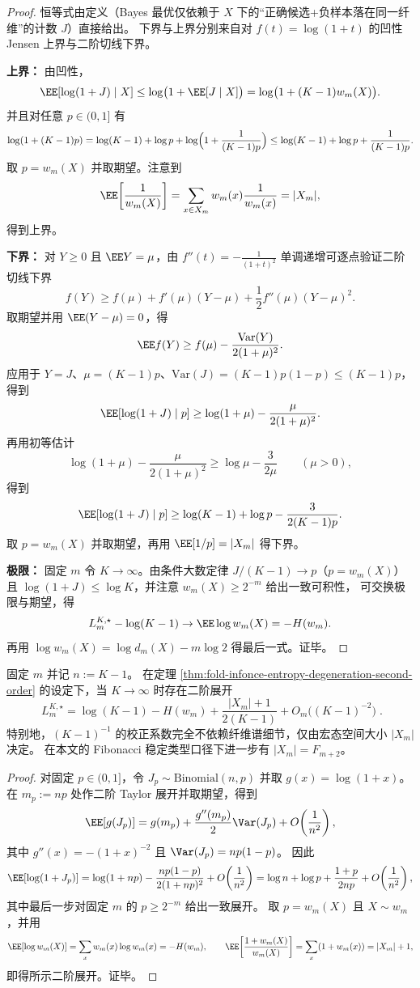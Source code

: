 \begin{proof}
恒等式由定义（Bayes 最优仅依赖于 \(X\) 下的“正确候选+负样本落在同一纤维”的计数 \(J\)）直接给出。
下界与上界分别来自对 \(f(t)=\log(1+t)\) 的凹性 Jensen 上界与二阶切线下界。
\par
\textbf{上界：}
由凹性，
\[
\EE[\log(1+J)\mid X]\le \log\bigl(1+\EE[J\mid X]\bigr)=\log\bigl(1+(K-1)w_m(X)\bigr).
\]
并且对任意 \(p\in(0,1]\) 有
\[
\log(1+(K-1)p)
=\log(K-1)+\log p+\log\Bigl(1+\frac{1}{(K-1)p}\Bigr)
\le \log(K-1)+\log p+\frac{1}{(K-1)p}.
\]
取 \(p=w_m(X)\) 并取期望。注意到
\[
\EE\!\left[\frac{1}{w_m(X)}\right]=\sum_{x\in X_m}w_m(x)\frac1{w_m(x)}=|X_m|,
\]
得到上界。
\par
\textbf{下界：}
对 \(Y\ge 0\) 且 \(\EE Y=\mu\)，由 \(f''(t)=-\frac{1}{(1+t)^2}\) 单调递增可逐点验证二阶切线下界
\[
f(Y)\ge f(\mu)+f'(\mu)(Y-\mu)+\frac12 f''(\mu)(Y-\mu)^2.
\]
取期望并用 \(\EE(Y-\mu)=0\)，得
\[
\EE f(Y)\ge f(\mu)-\frac{\mathrm{Var}(Y)}{2(1+\mu)^2}.
\]
应用于 \(Y=J\)、\(\mu=(K-1)p\)、\(\mathrm{Var}(J)=(K-1)p(1-p)\le (K-1)p\)，得到
\[
\EE[\log(1+J)\mid p]\ge \log(1+\mu)-\frac{\mu}{2(1+\mu)^2}.
\]
再用初等估计
\[
\log(1+\mu)-\frac{\mu}{2(1+\mu)^2}
\ge \log\mu-\frac{3}{2\mu}\qquad(\mu>0),
\]
得到
\[
\EE[\log(1+J)\mid p]\ge \log(K-1)+\log p-\frac{3}{2(K-1)p}.
\]
取 \(p=w_m(X)\) 并取期望，再用 \(\EE[1/p]=|X_m|\) 得下界。
\par
\textbf{极限：}
固定 \(m\) 令 \(K\to\infty\)。由条件大数定律 \(J/(K-1)\to p\)（\(p=w_m(X)\)）且 \(\log(1+J)\le \log K\)，并注意 \(w_m(X)\ge 2^{-m}\) 给出一致可积性，
可交换极限与期望，得
\[
L_m^{K,\star}-\log(K-1)\to \EE\log w_m(X)=-H(w_m).
\]
再用 \(\log w_m(X)=\log d_m(X)-m\log 2\) 得最后一式。证毕。
\end{proof}

\begin{corollary}[二阶渐近的显式系数仅依赖宏态基数]\label{cor:fold-infonce-bayes-second-order-universal-coefficient}
固定 \(m\) 并记 \(n:=K-1\)。
在定理 \ref{thm:fold-infonce-entropy-degeneration-second-order} 的设定下，当 \(K\to\infty\) 时存在二阶展开
\[
\boxed{\;
L_m^{K,\star}
=\log(K-1)-H(w_m)+\frac{|X_m|+1}{2(K-1)}+O_m\!\bigl((K-1)^{-2}\bigr)\; }.
\]
特别地，\((K-1)^{-1}\) 的校正系数完全不依赖纤维谱细节，仅由宏态空间大小 \(|X_m|\) 决定。
在本文的 Fibonacci 稳定类型口径下进一步有 \(|X_m|=F_{m+2}\)。
\end{corollary}
\begin{proof}
对固定 \(p\in(0,1]\)，令 \(J_p\sim\mathrm{Binomial}(n,p)\) 并取 \(g(x)=\log(1+x)\)。
在 \(m_p:=np\) 处作二阶 Taylor 展开并取期望，得到
\[
\EE[g(J_p)]
=g(m_p)+\frac{g''(m_p)}{2}\Var(J_p)+O\!\left(\frac{1}{n^2}\right),
\]
其中 \(g''(x)=-(1+x)^{-2}\) 且 \(\Var(J_p)=np(1-p)\)。
因此
\[
\EE[\log(1+J_p)]
=\log(1+np)-\frac{np(1-p)}{2(1+np)^2}+O\!\left(\frac{1}{n^2}\right)
=\log n+\log p+\frac{1+p}{2np}+O\!\left(\frac{1}{n^2}\right),
\]
其中最后一步对固定 \(m\) 的 \(p\ge 2^{-m}\) 给出一致展开。
取 \(p=w_m(X)\) 且 \(X\sim w_m\)，并用
\[
\EE[\log w_m(X)]=\sum_x w_m(x)\log w_m(x)=-H(w_m),
\qquad
\EE\!\left[\frac{1+w_m(X)}{w_m(X)}\right]
=\sum_x (1+w_m(x))=|X_m|+1,
\]
即得所示二阶展开。证毕。
\end{proof}

